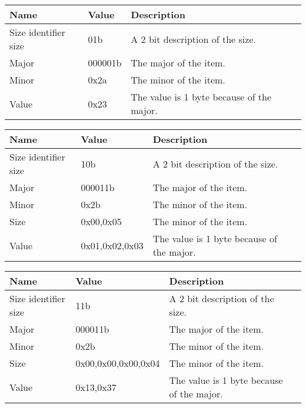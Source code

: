 \documentclass[11pt]{article}
\begin{document}
\begin{center}
\begin{tabular}{ |l|l|l|l| } 
\hline
\textbf{Name} & \textbf{Value} & \textbf{Description}\\
\hline
Size identifier size & 01b & A 2 bit description of the size.\\  
Major & 000001b & The major of the item.\\ 
Minor & 0x2a & The minor of the item.\\ 
Value & 0x23 & The value is 1 byte because of the major.\\ 
\hline
\end{tabular}
\end{center}

\begin{center}
\begin{tabular}{ |l|l|l|l| } 
\hline
\textbf{Name} & \textbf{Value} & \textbf{Description}\\
\hline
Size identifier size & 10b & A 2 bit description of the size.\\  
Major & 000011b & The major of the item.\\ 
Minor & 0x2b & The minor of the item.\\ 
Size & 0x00,0x05 & The minor of the item.\\ 
Value & 0x01,0x02,0x03 & The value is 1 byte because of the major.\\ 
\hline
\end{tabular}
\end{center}

\begin{center}
\begin{tabular}{ |l|l|l|l| } 
\hline
\textbf{Name} & \textbf{Value} & \textbf{Description}\\
\hline
Size identifier size & 11b & A 2 bit description of the size.\\  
Major & 000011b & The major of the item.\\ 
Minor & 0x2b & The minor of the item.\\ 
Size & 0x00,0x00,0x00,0x04 & The minor of the item.\\ 
Value & 0x13,0x37 & The value is 1 byte because of the major.\\ 
\hline
\end{tabular}
\end{center}
\end{document}
